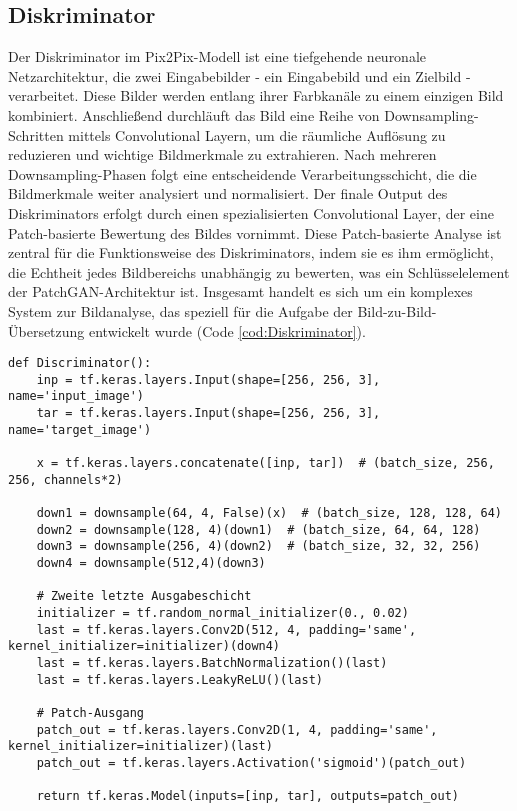 \subsection{Diskriminator}
Der Diskriminator im Pix2Pix-Modell ist eine tiefgehende neuronale Netzarchitektur, die zwei Eingabebilder - ein Eingabebild und ein Zielbild - verarbeitet. Diese Bilder werden entlang ihrer Farbkanäle zu einem einzigen Bild kombiniert. Anschließend durchläuft das Bild eine Reihe von Downsampling-Schritten mittels Convolutional Layern, um die räumliche Auflösung zu reduzieren und wichtige Bildmerkmale zu extrahieren. Nach mehreren Downsampling-Phasen folgt eine entscheidende Verarbeitungsschicht, die die Bildmerkmale weiter analysiert und normalisiert. Der finale Output des Diskriminators erfolgt durch einen spezialisierten Convolutional Layer, der eine Patch-basierte Bewertung des Bildes vornimmt. Diese Patch-basierte Analyse ist zentral für die Funktionsweise des Diskriminators, indem sie es ihm ermöglicht, die Echtheit jedes Bildbereichs unabhängig zu bewerten, was ein Schlüsselelement der PatchGAN-Architektur ist. Insgesamt handelt es sich um ein komplexes System zur Bildanalyse, das speziell für die Aufgabe der Bild-zu-Bild-Übersetzung entwickelt wurde (Code \ref{cod:Diskriminator}).
\newpage

\begin{lstlisting}[language=pyhaff, caption={Diskriminator Pix2Pix}, label={cod:Diskriminator}]
def Discriminator():
	inp = tf.keras.layers.Input(shape=[256, 256, 3], name='input_image')
	tar = tf.keras.layers.Input(shape=[256, 256, 3], name='target_image')
	
	x = tf.keras.layers.concatenate([inp, tar])  # (batch_size, 256, 256, channels*2)
	
	down1 = downsample(64, 4, False)(x)  # (batch_size, 128, 128, 64)
	down2 = downsample(128, 4)(down1)  # (batch_size, 64, 64, 128)
	down3 = downsample(256, 4)(down2)  # (batch_size, 32, 32, 256)
	down4 = downsample(512,4)(down3)
	
	# Zweite letzte Ausgabeschicht
	initializer = tf.random_normal_initializer(0., 0.02)
	last = tf.keras.layers.Conv2D(512, 4, padding='same', kernel_initializer=initializer)(down4)
	last = tf.keras.layers.BatchNormalization()(last)
	last = tf.keras.layers.LeakyReLU()(last)
	
	# Patch-Ausgang
	patch_out = tf.keras.layers.Conv2D(1, 4, padding='same', kernel_initializer=initializer)(last)
	patch_out = tf.keras.layers.Activation('sigmoid')(patch_out)
	
	return tf.keras.Model(inputs=[inp, tar], outputs=patch_out)
\end{lstlisting}

